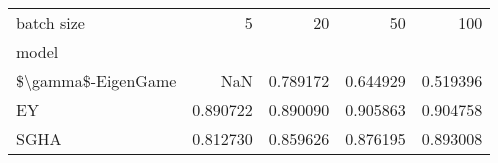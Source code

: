 \begin{tabular}{lrrrr}
\toprule
batch size &       5   &       20  &       50  &       100 \\
model              &           &           &           &           \\
\midrule
\$\textbackslash gamma\$-EigenGame &       NaN &  0.789172 &  0.644929 &  0.519396 \\
EY                 &  0.890722 &  0.890090 &  0.905863 &  0.904758 \\
SGHA               &  0.812730 &  0.859626 &  0.876195 &  0.893008 \\
\bottomrule
\end{tabular}
